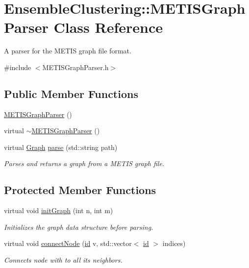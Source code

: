 \hypertarget{class_ensemble_clustering_1_1_m_e_t_i_s_graph_parser}{\section{Ensemble\-Clustering\-:\-:M\-E\-T\-I\-S\-Graph\-Parser Class Reference}
\label{class_ensemble_clustering_1_1_m_e_t_i_s_graph_parser}
}


A parser for the M\-E\-T\-I\-S graph file format.  




{\ttfamily \#include $<$M\-E\-T\-I\-S\-Graph\-Parser.\-h$>$}

\subsection*{Public Member Functions}
\begin{DoxyCompactItemize}
\item 
\hyperlink{class_ensemble_clustering_1_1_m_e_t_i_s_graph_parser_a368585c6c1b9cfd6e95bd3ddd6547792}{M\-E\-T\-I\-S\-Graph\-Parser} ()
\item 
virtual \hyperlink{class_ensemble_clustering_1_1_m_e_t_i_s_graph_parser_a6d946610b24a1ed6cfe996379d3e5284}{$\sim$\-M\-E\-T\-I\-S\-Graph\-Parser} ()
\item 
virtual \hyperlink{class_ensemble_clustering_1_1_graph}{Graph} \hyperlink{class_ensemble_clustering_1_1_m_e_t_i_s_graph_parser_a28c963c44b2a559f1f26a68ce55b8650}{parse} (std\-::string path)
\begin{DoxyCompactList}\small\item\em Parses and returns a graph from a M\-E\-T\-I\-S graph file. \end{DoxyCompactList}\end{DoxyCompactItemize}
\subsection*{Protected Member Functions}
\begin{DoxyCompactItemize}
\item 
virtual void \hyperlink{class_ensemble_clustering_1_1_m_e_t_i_s_graph_parser_ad78da77d9f2eba97f3f3b755c18cf4ba}{init\-Graph} (int n, int m)
\begin{DoxyCompactList}\small\item\em Initializes the graph data structure before parsing. \end{DoxyCompactList}\item 
virtual void \hyperlink{class_ensemble_clustering_1_1_m_e_t_i_s_graph_parser_a7108ff92f806af29c49461f7e117ebbe}{connect\-Node} (\hyperlink{namespace_ensemble_clustering_a3228848abf8dfd6602f3b08dd459ea20}{id} v, std\-::vector$<$ \hyperlink{namespace_ensemble_clustering_a3228848abf8dfd6602f3b08dd459ea20}{id} $>$ indices)
\begin{DoxyCompactList}\small\item\em Connects node with to all its neighbors. \end{DoxyCompactList}\end{DoxyCompactItemize}


